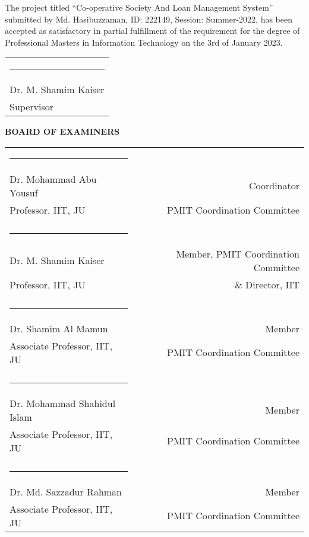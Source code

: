 The project titled “Co-operative Society And Loan Management System” submitted by Md. Hasibuzzaman, ID: 222149, Session: Summer-2022, has been accepted as satisfactory in partial fulfillment of the requirement for the degree of Professional Masters in Information Technology on the 3rd of January 2023.


\bigskip
\bigskip
\bigskip

\noindent \begin{tabular}{l}

  \rule{4cm}{1pt} \\
  Dr. M. Shamim Kaiser\\ %
  Supervisor\\

\end{tabular}




\begin{center}
   \textbf{BOARD OF EXAMINERS}
\end{center}
\noindent \begin{tabular}{lp{1cm}r}
\centering
  \rule{4cm}{1pt}&\\
     Dr. Mohammad Abu Yousuf  &&Coordinator  \\
     Professor, IIT, JU  & & PMIT Coordination Committee  \\
     & &  \\
     \rule{4cm}{1pt}&\\
    Dr. M. Shamim Kaiser  & &Member, PMIT Coordination Committee   \\
     Professor, IIT, JU  & &\& Director, IIT\\
    & &  \\
     \rule{4cm}{1pt}&\\
     Dr. Shamim Al Mamun & &Member  \\
      Associate Professor, IIT, JU  & &PMIT Coordination Committee  \\
     &  \\
     \rule{4cm}{1pt}&\\
     Dr. Mohammad Shahidul Islam   & &Member  \\
      Associate Professor, IIT, JU  & &PMIT Coordination Committee  \\
      &  \\
     \rule{4cm}{1pt}&\\
     Dr. Md. Sazzadur Rahman  & &Member  \\
      Associate Professor, IIT, JU  & &PMIT Coordination Committee  \\
     
   

\end{tabular}


